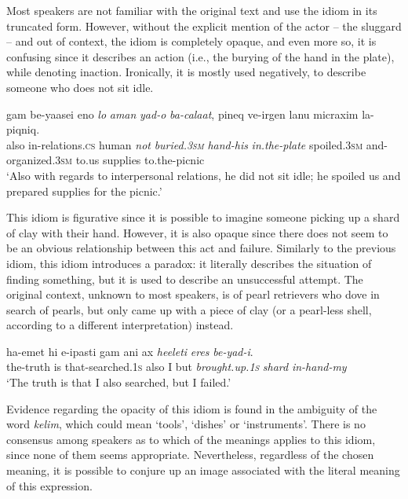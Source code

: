 \documentclass[output=paper]{langsci/langscibook}
\begin{document}
Most  speakers are not familiar with the original text and use the idiom in its truncated form. However, without the explicit mention of the actor -- the sluggard -- and out of context, the idiom is completely opaque, and even more so, it is confusing since it describes an action (i.e., the burying of the hand in the plate), while denoting inaction. Ironically, it is mostly used negatively, to describe someone who does not sit idle.


	\ea\label{she:taman-canon}
    	\gll gam be-ya{\het}asei {\alef}eno{\shin} \textit{lo} \textit{{\tet}aman} \textit{yad-o} \textit{ba-cala{\het}at}, pineq ve-{\alef}irgen lanu micraxim la-piqniq.\\
    	   also in-relations.\textsc{cs} human \textit{not} \textit{buried.\textsc{3sm}} \textit{hand-his} \textit{in.the-plate} spoiled.\textsc{3sm} and-organized.\textsc{3sm} to.us supplies to.the-picnic\\
    	\glt `Also with regards to interpersonal relations, he did not sit idle; he spoiled us and prepared supplies for the picnic.'
	\z

This idiom is figurative since it is possible to imagine someone picking up a shard of clay with their hand. However, it is also opaque since there does not seem to be an obvious relationship between this act and failure. Similarly to the previous idiom, this idiom introduces a paradox: it literally describes the situation of finding something, but it is used to describe an unsuccessful attempt. The original context, unknown to most speakers, is of pearl retrievers who dove in search of pearls, but only came up with a piece of clay (or a pearl-less shell, according to a different interpretation) instead.

	\ea\label{she:xeres-canon}
	\gll ha-{\alef}emet hi {\shin}e-{\het}ipasti gam {\alef}ani {\alef}ax \textit{he{\ayin}eleti} \textit{{\het}eres} \textit{be-yad-i}.\\
	   the-truth is that-searched.\textsc{1s} also I but \textit{brought.up.\textsc{1s}} \textit{shard} \textit{in-hand-my} \\
	\glt `The truth is that I also searched, but I failed.'
	\z	

Evidence regarding the opacity of this idiom is found in the ambiguity of the word \textit{kelim}, which could mean `tools', `dishes' or `instruments'. There is no consensus among speakers as to which of the meanings applies to this idiom, since none of them seems appropriate. Nevertheless, regardless of the chosen meaning, it is possible to conjure up an image associated with the literal meaning of this expression.
\end{document}
